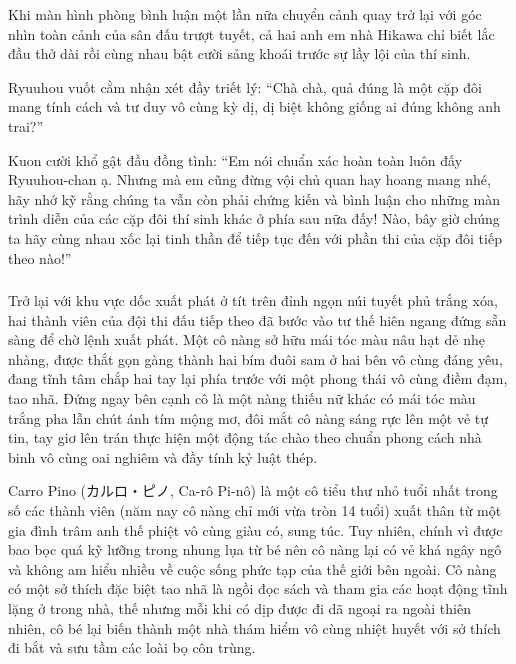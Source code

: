 \documentclass[../main.tex]{subfiles}
\begin{document}
Khi màn hình phòng bình luận một lần nữa chuyển cảnh quay trở lại với góc nhìn toàn cảnh của sân đấu trượt tuyết, cả hai anh em nhà Hikawa chỉ biết lắc đầu thở dài rồi cùng nhau bật cười sảng khoái trước sự lầy lội của thí sinh.

Ryuuhou vuốt cằm nhận xét đầy triết lý: ``Chà chà, quả đúng là một cặp đôi mang tính cách và tư duy vô cùng kỳ dị, dị biệt không giống ai đúng không anh trai?''

Kuon cười khổ gật đầu đồng tình: ``Em nói chuẩn xác hoàn toàn luôn đấy Ryuuhou-chan ạ. Nhưng mà em cũng đừng vội chủ quan hay hoang mang nhé, hãy nhớ kỹ rằng chúng ta vẫn còn phải chứng kiến và bình luận cho những màn trình diễn của các cặp đôi thí sinh khác ở phía sau nữa đấy! Nào, bây giờ chúng ta hãy cùng nhau xốc lại tinh thần để tiếp tục đến với phần thi của cặp đôi tiếp theo nào!''

\subsubsection*{\label{ep-003.I}}

Trở lại với khu vực dốc xuất phát ở tít trên đỉnh ngọn núi tuyết phủ trắng xóa, hai thành viên của đội thi đấu tiếp theo đã bước vào tư thế hiên ngang đứng sẵn sàng để chờ lệnh xuất phát. Một cô nàng sở hữu mái tóc màu nâu hạt dẻ nhẹ nhàng, được thắt gọn gàng thành hai bím đuôi sam ở hai bên vô cùng đáng yêu, đang tĩnh tâm chắp hai tay lại phía trước với một phong thái vô cùng điềm đạm, tao nhã. Đứng ngay bên cạnh cô là một nàng thiếu nữ khác có mái tóc màu trắng pha lẫn chút ánh tím mộng mơ, đôi mắt cô nàng sáng rực lên một vẻ tự tin, tay giơ lên trán thực hiện một động tác chào theo chuẩn phong cách nhà binh vô cùng oai nghiêm và đầy tính kỷ luật thép.

\chrint


Carro Pino (カルロ・ピノ, Ca-rô Pi-nô) là một cô tiểu thư nhỏ tuổi nhất trong số các thành viên (năm nay cô nàng chỉ mới vừa tròn 14 tuổi) xuất thân từ một gia đình trâm anh thế phiệt vô cùng giàu có, sung túc. Tuy nhiên, chính vì được bao bọc quá kỹ lưỡng trong nhung lụa từ bé nên cô nàng lại có vẻ khá ngây ngô và không am hiểu nhiều về cuộc sống phức tạp của thế giới bên ngoài. Cô nàng có một sở thích đặc biệt tao nhã là ngồi đọc sách và tham gia các hoạt động tĩnh lặng ở trong nhà, thế nhưng mỗi khi có dịp được đi dã ngoại ra ngoài thiên nhiên, cô bé lại biến thành một nhà thám hiểm vô cùng nhiệt huyết với sở thích đi bắt và sưu tầm các loài bọ côn trùng.
\end{document}
